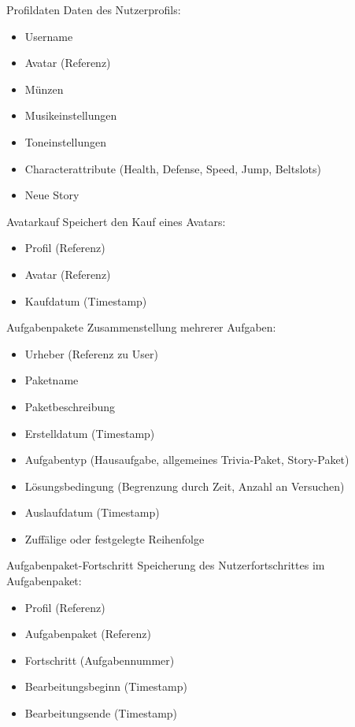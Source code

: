 \begin{data}{40}{Profildaten}
	Daten des Nutzerprofils:
	\begin{itemize}
		\item Username
		\item Avatar (Referenz)
		\item Münzen
		\item Musikeinstellungen
		\item Toneinstellungen
		\item Characterattribute (Health, Defense, Speed, Jump, Beltslots)
		\item Neue Story
	\end{itemize}
\end{data}

\begin{data}{50}{Avatarkauf}
	Speichert den Kauf eines Avatars:
	\begin{itemize}
		\item Profil (Referenz)
		\item Avatar (Referenz)
		\item Kaufdatum (Timestamp)
	\end{itemize}
\end{data}

\begin{data}{60}{Aufgabenpakete}
	Zusammenstellung mehrerer Aufgaben:
	\begin{itemize}
		\item Urheber (Referenz zu User)
		\item Paketname
		\item Paketbeschreibung
		\item Erstelldatum (Timestamp)
		\item Aufgabentyp (Hausaufgabe, allgemeines Trivia-Paket, Story-Paket)
		\item Lösungsbedingung (Begrenzung durch Zeit, Anzahl an Versuchen)
		\item Auslaufdatum (Timestamp)
		\item Zuffälige oder festgelegte Reihenfolge
	\end{itemize}
\end{data}

\begin{data}{70}{Aufgabenpaket-Fortschritt}
	Speicherung des Nutzerfortschrittes im Aufgabenpaket:
	\begin{itemize}
		\item Profil (Referenz)
		\item Aufgabenpaket (Referenz)
		\item Fortschritt (Aufgabennummer)
		\item Bearbeitungsbeginn (Timestamp)
		\item Bearbeitungsende (Timestamp)		
	\end{itemize}
\end{data}

